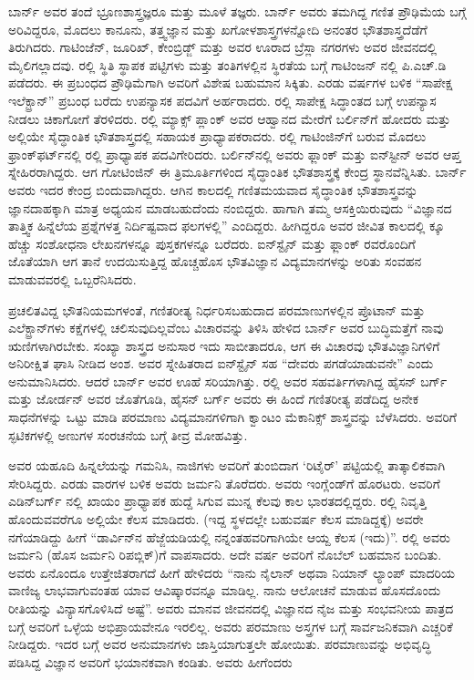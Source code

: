 ಬಾರ್ನ್ ಅವರ ತಂದೆ ಭ್ರೂಣಶಾಸ್ತ್ರಜ್ಞರೂ ಮತ್ತು ಮೂಳೆ ತಜ್ಞರು. ಬಾರ್ನ್ ಅವರು ತಮಗಿದ್ದ ಗಣಿತ ಪ್ರೌಢಿಮೆಯ ಬಗ್ಗೆ ಅರಿವಿದ್ದರೂ, ಮೊದಲು ಕಾನೂನು, ತತ್ತ್ವಜ್ಞಾನ ಮತ್ತು ಖಗೋಳಶಾಸ್ತ್ರಗಳನ್ನೋದಿ ಅನಂತರ ಭೌತಶಾಸ್ತ್ರದೆಡೆಗೆ ತಿರುಗಿದರು. ಗಾಟಿಂಜೆನ್, ಜೂರಿಖ್, ಕೇಂಬ್ರಿಡ್ಜ್ ಮತ್ತು ಅವರ ಊರಾದ ಬ್ರೆಸ್ಲಾ ನಗರಗಳು ಅವರ ಜೀವನದಲ್ಲಿ ಮೈಲಿಗಲ್ಲಾದವು. ರಲ್ಲಿ ಸ್ಥಿತಿ ಸ್ಥಾಪಕ ಪಟ್ಟಿಗಳು ಮತ್ತು ತಂತಿಗಳಲ್ಲಿನ ಸ್ಥಿರತೆಯ ಬಗ್ಗೆ ಗಾಟಿಂಜನ್ ನಲ್ಲಿ ಪಿ.ಎಚ್.ಡಿ ಪಡೆದರು. ಈ ಪ್ರಬಂಧದ ಪ್ರೌಢಿಮೆಗಾಗಿ ಅವರಿಗೆ ವಿಶೇಷ ಬಹುಮಾನ ಸಿಕ್ಕಿತು. ಎರಡು ವರ್ಷಗಳ ಬಳಿಕ “ಸಾಪೇಕ್ಷ ಇಲೆಕ್ಟ್ರಾನ್” ಪ್ರಬಂಧ ಬರೆದು ಉಪನ್ಯಾಸಕ ಪದವಿಗೆ ಅರ್ಹರಾದರು. ರಲ್ಲಿ ಸಾಪೇಕ್ಷ ಸಿದ್ಧಾಂತದ ಬಗ್ಗೆ ಉಪನ್ಯಾಸ ನೀಡಲು ಚಿಕಾಗೋಗೆ ತೆರಳಿದರು. ರಲ್ಲಿ ಮ್ಯಾಕ್ಸ್ ಪ್ಲಾಂಕ್ ಅವರ ಆಹ್ವಾನದ ಮೇರೆಗೆ ಬರ್ಲಿನ್‍ಗೆ ಹೋದರು ಮತ್ತು ಅಲ್ಲಿಯೇ ಸೈದ್ಧಾಂತಿಕ ಭೌತಶಾಸ್ತ್ರದಲ್ಲಿ ಸಹಾಯಕ ಪ್ರಾಧ್ಯಾಪಕರಾದರು. ರಲ್ಲಿ ಗಾಟಿಂಜಿನ್‍ಗೆ ಬರುವ ಮೊದಲು ಫ್ರಾಂಕ್‌ಫರ್ಟ್‌ನಲ್ಲಿ ರಲ್ಲಿ ಪ್ರಾಧ್ಯಾಪಕ ಪದವಿಗೇರಿದರು.
ಬರ್ಲಿನ್‍ನಲ್ಲಿ ಅವರು ಫ್ಲಾಂಕ್ ಮತ್ತು ಐನ್‍ಸ್ಟೀನ್ ಅವರ ಆಪ್ತ ಸ್ನೇಹಿರರಾಗಿದ್ದರು. ಆಗ ಗೋಟಿಂಜಿನ್ ಈ ತ್ರಿಮೂರ್ತಿಗಳಿಂದ ಸೈದ್ಧಾಂತಿಕ ಭೌತಶಾಸ್ತ್ರಕ್ಕೆ ಕೇಂದ್ರ ಸ್ಥಾನವೆನ್ನಿಸಿತು. ಬಾರ್ನ್ ಅವರು ಇದರ ಕೇಂದ್ರ ಬಿಂದುವಾಗಿದ್ದರು. ಆಗಿನ ಕಾಲದಲ್ಲಿ ಗಣಿತಮಯವಾದ ಸೈದ್ಧಾಂತಿಕ ಭೌತಶಾಸ್ತ್ರವನ್ನು ಜ್ಞಾನದಾಹಕ್ಕಾಗಿ ಮಾತ್ರ ಅಧ್ಯಯನ ಮಾಡಬಹುದೆಂದು ನಂಬಿದ್ದರು. ಹಾಗಾಗಿ ತಮ್ಮ ಆಸಕ್ತಿಯಿರುವುದು “ವಿಜ್ಞಾನದ ತಾತ್ತ್ವಿಕ ಹಿನ್ನೆಲೆಯ ಪ್ರಶ್ನೆಗಳತ್ತ ನಿರ್ದಿಷ್ಟವಾದ ಫಲಗಳಲ್ಲಿ” ಎಂದಿದ್ದರು. ಹೀಗಿದ್ದರೂ ಅವರ ಜೀವಿತ ಕಾಲದಲ್ಲಿ  ಕ್ಕೂ ಹೆಚ್ಚು ಸಂಶೋಧನಾ ಲೇಖನಗಳನ್ನೂ  ಪುಸ್ತಕಗಳನ್ನೂ ಬರೆದರು. ಐನ್‍ಸ್ಟೈನ್ ಮತ್ತು ಫ್ಲಾಂಕ್ ರವರೊಂದಿಗೆ ಜೊತೆಯಾಗಿ ಆಗ ತಾನೆ ಉದಯಿಸುತ್ತಿದ್ದ ಹೊಚ್ಚಹೊಸ ಭೌತವಿಜ್ಞಾನ ವಿದ್ಯಮಾನಗಳನ್ನು ಅರಿತು ಸಂವಹನ ಮಾಡುವವರಲ್ಲಿ ಒಬ್ಬರೆನಿಸಿದರು.

ಪ್ರಚಲಿತವಿದ್ದ ಭೌತನಿಯಮಗಳಂತೆ, ಗಣಿತರೀತ್ಯ ನಿರ್ಧರಿಸಬಹುದಾದ ಪರಮಾಣುಗಳಲ್ಲಿನ ಪ್ರೊಟಾನ್ ಮತ್ತು ಎಲೆಕ್ಟ್ರಾನ್‍ಗಳು ಕಕ್ಷೆಗಳಲ್ಲಿ ಚಲಿಸುವುದಿಲ್ಲವೆಂಬ ವಿಚಾರವನ್ನು ತಿಳಿಸಿ ಹೇಳಿದ ಬಾರ್ನ್ ಅವರ ಬುದ್ಧಿಮತ್ತೆಗೆ ನಾವು ಋಣಿಗಳಾಗಿರಬೇಕು. ಸಂಖ್ಯಾ ಶಾಸ್ತ್ರದ ಅನುಸಾರ ಇದು ಸಾಬೀತಾದರೂ, ಆಗ ಈ ವಿಚಾರವು ಭೌತವಿಜ್ಞಾನಿಗಳಿಗೆ ಅನಿರೀಕ್ಷಿತ ಘಾಸಿ ನೀಡಿದ ಅಂಶ. ಅವರ ಸ್ನೇಹಿತರಾದ ಐನ್‍ಸ್ಟೈನ್ ಸಹ “ದೇವರು ಪಗಡೆಯಾಡುವನೇ” ಎಂದು ಅನುಮಾನಿಸಿದರು. ಆದರೆ ಬಾರ್ನ್ ಅವರ ಊಹೆ ಸರಿಯಾಗಿತ್ತು. ರಲ್ಲಿ ಅವರ ಸಹವರ್ತಿಗಳಾಗಿದ್ದ ಹೈಸನ್ ಬರ್ಗ್ ಮತ್ತು ಜೋರ್ಡನ್ ಅವರ ಜೊತೆಗೂಡಿ, ಹೈಸನ್ ಬರ್ಗ್ ಅವರು ಈ ಹಿಂದೆ ಗಣಿತರೀತ್ಯ ಪಡೆದಿದ್ದ ಅನೇಕ ಸಾಧನೆಗಳನ್ನು ಒಟ್ಟು ಮಾಡಿ ಪರಮಾಣು ವಿದ್ಯಮಾನಗಳಿಗಾಗಿ ಕ್ವಾಂಟಂ ಮೆಕಾನಿಕ್ಸ್ ಶಾಸ್ತ್ರವನ್ನು ಬೆಳೆಸಿದರು. ಅವರಿಗೆ ಸ್ಫಟಿಕಗಳಲ್ಲಿ ಅಣುಗಳ ಸಂರಚನೆಯ ಬಗ್ಗೆ ತೀವ್ರ ಮೋಹವಿತ್ತು.

ಅವರ ಯಹೂದಿ ಹಿನ್ನಲೆಯನ್ನು ಗಮನಿಸಿ, ನಾಜಿಗಳು ಅವರಿಗೆ  ತುಂಬಿದಾಗ ‘ರಿಟೈರ್’ ಪಟ್ಟಿಯಲ್ಲಿ ತಾತ್ಕಾಲಿಕವಾಗಿ ಸೇರಿಸಿದ್ದರು. ಎರಡು ವಾರಗಳ ಬಳಿಕ ಅವರು ಜರ್ಮನಿ ತೊರೆದರು. ಅವರು ಇಂಗ್ಲೆಂಡ್‍ಗೆ ಹೊರಟರು. ಅವರಿಗೆ ಎಡಿನ್‍ಬರ್ಗ್ ನಲ್ಲಿ ಖಾಯಂ ಪ್ರಾಧ್ಯಾಪಕ ಹುದ್ದೆ ಸಿಗುವ ಮುನ್ನ ಕೆಲವು ಕಾಲ ಭಾರತದಲ್ಲಿದ್ದರು. ರಲ್ಲಿ ನಿವೃತ್ತಿ ಹೊಂದುವವರೆಗೂ ಅಲ್ಲಿಯೇ ಕೆಲಸ ಮಾಡಿದರು. (ಇದ್ದ ಸ್ಥಳದಲ್ಲೇ ಬಹುವರ್ಷ ಕೆಲಸ ಮಾಡಿದ್ದಕ್ಕೆ) ಅವರೇ ನಗೆಯಾಡಿದ್ದು ಹೀಗೆ\enginline{--} “ಡಾರ್ವಿನ್‍ನ ಹೆಜ್ಜೆಯಡಿಯಲ್ಲಿ ನನ್ನಂತಹವರಿಗಾಗಿಯೇ ಆಯ್ದ ಕೆಲಸ (ಇದು)”. ರಲ್ಲಿ ಅವರು ಜರ್ಮನಿ (ಹೊಸ ಜರ್ಮನಿ ರಿಪಬ್ಲಿಕ್)ಗೆ ವಾಪಸಾದರು. ಅದೇ ವರ್ಷ ಅವರಿಗೆ ನೊಬೆಲ್ ಬಹಮಾನ ಬಂದಿತು. ಅವರು ಏನೊಂದೂ ಉತ್ತೇಜಿತರಾಗದೆ ಹೀಗೆ ಹೇಳಿದರು\enginline{--} “ನಾನು ನೈಲಾನ್ ಅಥವಾ ನಿಯಾನ್ ಲ್ಯಾಂಪ್ ಮಾದರಿಯ ವಾಣಿಜ್ಯ ಲಾಭವಾಗುವಂತಹ ಯಾವ ಆವಿಷ್ಕಾರವನ್ನೂ ಮಾಡಿಲ್ಲ. ನಾನು ಆಲೋಚನೆ ಮಾಡುವ ಹೊಸದೊಂದು ರೀತಿಯನ್ನು ವಿನ್ಯಾಸಗೊಳಿಸಿದೆ ಅಷ್ಟೆ”. ಅವರು ಮಾನವ ಜೀವನದಲ್ಲಿ ವಿಜ್ಞಾನದ ನೈಜ ಮತ್ತು ಸಂಭವನೀಯ ಪಾತ್ರದ ಬಗ್ಗೆ ಅವರಿಗೆ ಒಳ್ಳೆಯ ಅಭಿಪ್ರಾಯವೇನೂ ಇರಲಿಲ್ಲ. ಅವರು ಪರಮಾಣು ಅಸ್ತ್ರಗಳ ಬಗ್ಗೆ ಸಾರ್ವಜನಿಕವಾಗಿ ಎಚ್ಚರಿಕೆ ನೀಡಿದ್ದರು. ಇದರ ಬಗ್ಗೆ ಅವರ ಅನುಮಾನಗಳು ಜಾಸ್ತಿಯಾಗುತ್ತಲೇ ಹೋಯಿತು. ಪರಮಾಣುವನ್ನು ಅಭಿವೃದ್ಧಿ ಪಡಿಸಿದ್ದ ವಿಜ್ಞಾನ ಅವರಿಗೆ ಭಯಾನಕವಾಗಿ ಕಂಡಿತು. ಅವರು ಹೀಗೆಂದರು\enginline{:}

